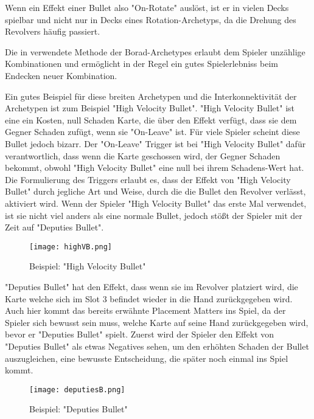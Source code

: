 Wenn ein Effekt einer Bullet also "On-Rotate" auslöst, ist er in vielen Decks spielbar und nicht nur in Decks
eines Rotation-Archetyps, da die Drehung des Revolvers häufig passiert.

Die in \FF verwendete Methode der Borad-Archetypes erlaubt dem Spieler unzählige Kombinationen und ermöglicht
in der Regel ein gutes Spielerlebniss beim Endecken neuer Kombination.


Ein gutes Beispiel für diese breiten Archetypen und die Interkonnektivität der Archetypen ist zum Beispiel "High Velocity Bullet".
"High Velocity Bullet" ist eine ein Kosten, null Schaden Karte, die über den Effekt verfügt, dass sie dem Gegner Schaden zufügt, wenn sie "On-Leave" ist.
Für viele Spieler scheint diese Bullet jedoch bizarr. Der "On-Leave" Trigger ist bei "High Velocity Bullet" dafür verantwortlich,
dass wenn die Karte geschossen wird, der Gegner Schaden bekommt, obwohl "High Velocity Bullet" eine null bei ihrem Schadens-Wert hat.
Die Formulierung des Triggers erlaubt es, dass der Effekt von "High Velocity Bullet" durch jegliche Art und Weise, durch
die die Bullet den Revolver verlässt, aktiviert wird. Wenn der Spieler "High Velocity Bullet" das erste Mal verwendet,
ist sie nicht viel anders als eine normale Bullet, jedoch stößt der Spieler mit der Zeit auf "Deputies Bullet".

\begin{figure}[H]
    \texttt{[image: highVB.png]}
    \caption{Beispiel: "High Velocity Bullet"}
\end{figure}


"Deputies Bullet" hat den Effekt, dass wenn sie im Revolver platziert wird, die Karte welche sich im Slot 3 befindet wieder in die Hand
zurückgegeben wird. Auch hier kommt das bereits erwähnte Placement Matters ins Spiel, da der Spieler sich bewusst sein
muss, welche Karte auf seine Hand zurückgegeben wird, bevor er "Deputies Bullet" spielt. Zuerst wird der Spieler den
Effekt von "Deputies Bullet" als etwas Negatives sehen, um den erhöhten Schaden der Bullet auszugleichen,
eine bewusste Entscheidung, die später noch einmal ins Spiel kommt.

\begin{figure}[H]
    \texttt{[image: deputiesB.png]}
    \caption{Beispiel: "Deputies Bullet"}
\end{figure}

